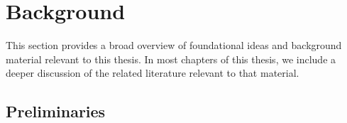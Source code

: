 \chapter{Background}
\label{sec:background}
This section provides a broad overview of foundational ideas
and background material relevant to this thesis.
In most chapters of this thesis, we include a deeper
discussion of the related literature relevant to
that material.

\section{Preliminaries}


